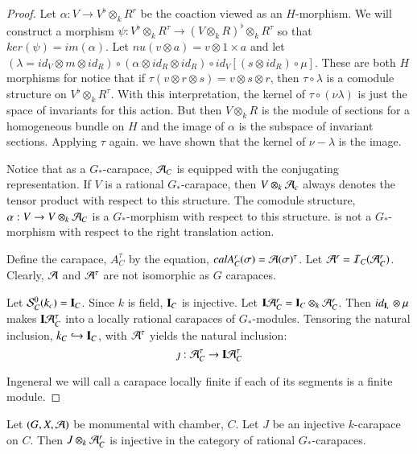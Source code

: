 \begin{proof}
Let $\alpha : V \rightarrow V^{\flat} \otimes_{k}R^{r}$ be the coaction viewed as an $H$-morphism. We will construct a morphism $\psi : V^{\flat} \otimes_{k}R^{\tau} \rightarrow (V \otimes_{k} R)^{\flat} \otimes_{k}R^{\tau}$ so that $ker(\psi) = im(\alpha)$. Let $nu(v \otimes a) = v \otimes 1 \times a $ and let $(\lambda = id_{V} \otimes m \otimes id_{R})\circ (\alpha \otimes id_{R} \otimes id_{R}) \circ id_{V}[(s \otimes id_{R}) \circ \mu]$. These are both $H$ morphisms for notice that if $\tau(v \otimes r \otimes s) = v \otimes s \otimes r$, then $\tau \circ \lambda$ is a comodule structure on $V^{\flat} \otimes_{k} R^{\tau}$. With this interpretation, the kernel of $\tau \circ (\nu \lambda)$ is just the space of invariants for this action. But then $V \otimes_{k} R$ is the module of sections for a homogeneous bundle on $H$ and the image of $\alpha$ is the subspace of invariant sections. Applying $\tau$ again. we have shown that the kernel of $\nu-\lambda$ is the image.

Notice that as a $G_{*}$-carapace, $\mathcal{A}_{C}$ is equipped with  the conjugating representation. If $V$ is a rational $G_{*}$-carapace, then $V \otimes_{k} \mathcal{A}_{c}$ always denotes the tensor product with respect to this structure. The comodule structure, $\alpha : V\rightarrow V \otimes_{k} \mathcal{A}_{C}$ is a $G_{*}$-morphism with respect to this structure. is not a $G_{*}$-morphism with respect to the right translation action.

Define the carapace, $A_{C}^{\tau}$ by the equation, $calA_{C}^{r}(\sigma) = \mathcal{A}(\sigma)^{\tau}$. Let $\mathcal{A}^{r} = \mathcal{I}_{C}(\mathcal{A}_{C}^{r})$.  Clearly, $\mathcal{A}$ and $\mathcal{A}^{\tau}$ are not isomorphic as  $G$ carapaces.

Let $\mathcal{S}_{C}^{0}(k_{c}) = \mathbf{I}_{C}$. Since $k$ is field, $\mathbf{I}_{C}$ is injective. Let $\mathbf{I}\mathcal{A}_{C}^{r}= \mathbf{I}_{C}\otimes_{k}\mathcal{A}_{C}^{r}$. Then $id_{\mathbf{I}_{c}} \otimes \mu$ makes $\mathbf{I}\mathcal{A}_{C}^{\tau}$ into a locally rational carapaces of $G_{*}$-modules. Tensoring the natural inclusion, $k_{C}\hookrightarrow \mathbf{I}_{C}$, with $\mathcal{A}^{\tau}$ yields the natural inclusion:
$$
\jmath: \mathcal{A}_{C}^{\tau} \rightarrow \mathbf{I}\mathcal{A}_{C}^{\tau}
$$

In\pageoriginale general we will call a carapace locally finite if each of its segments is a finite module.
\end{proof}

\begin{secprop}\label{chap6-prop-14.3}
Let $(G, X, \mathcal{A})$ be monumental with chamber, $C$. Let $J$ be an injective $k$-carapace on $C$. Then $J\otimes_{k} \mathcal{A}_{C}^{r}$ is injective in the category of rational $G_{*}$-carapaces.
\end{secprop}

